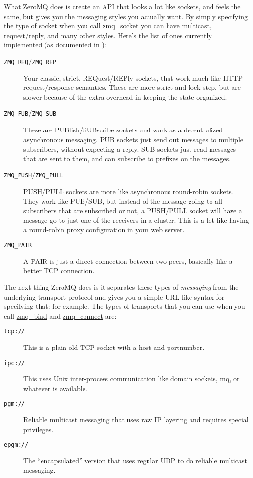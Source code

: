 What ZeroMQ does is create an API that looks a lot like sockets, and feels the
same, but gives you the messaging styles you actually want.  By simply
specifying the type of socket when you call
\href{http://api.zeromq.org/zmq\_socket.html}{zmq\_socket} you can have
multicast, request/reply, and many other styles.  Here's the list of ones
currently implemented (as documented in ):

\begin{description}
  \item [\texttt{ZMQ\_REQ}/\texttt{ZMQ\_REP}]  Your classic, strict, REQuest/REPly sockets, that work much like
    HTTP request/response semantics.  These are more strict and lock-step, but are slower
    because of the extra overhead in keeping the state organized.
  \item [\texttt{ZMQ\_PUB}/\texttt{ZMQ\_SUB}]  These are PUBlish/SUBscribe sockets and work as a decentralized
    asynchronous messaging.  PUB sockets just send out messages to multiple subscribers, without
    expecting a reply.  SUB sockets just read messages that are sent to them, and can subscribe
    to prefixes on the messages.
  \item [\texttt{ZMQ\_PUSH}/\texttt{ZMQ\_PULL}] PUSH/PULL sockets are more like asynchronous round-robin
    sockets.  They work like PUB/SUB, but instead of the message going to all subscribers that
    are subscribed or not, a PUSH/PULL socket will have a message go to just one of the receivers
    in a cluster.  This is a lot like having a round-robin proxy configuration in your web server.
  \item [\texttt{ZMQ\_PAIR}] A PAIR is just a direct connection between two peers, basically like a better
    TCP connection.
\end{description}

The next thing ZeroMQ does is it separates these types of \emph{messaging} from the underlying
transport protocol and gives you a simple URL-like syntax for specifying that: 
for example.  The types of transports that you can use when you call \href{http://api.zeromq.org/zmq\_bind.html}{zmq\_bind}
and \href{http://api.zeromq.org/zmq\_connect.html}{zmq\_connect} are:

\begin{description}
\item [\texttt{tcp://}] This is a plain old TCP socket with a host and portnumber.
\item [\texttt{ipc://}] This uses Unix inter-process communication like domain sockets, mq, or whatever is available.
\item [\texttt{pgm://}] Reliable multicast messaging that uses raw IP layering and requires special privileges.
\item [\texttt{epgm://}] The ``encapsulated'' version that uses regular UDP to do reliable multicast messaging.
\end{description}

